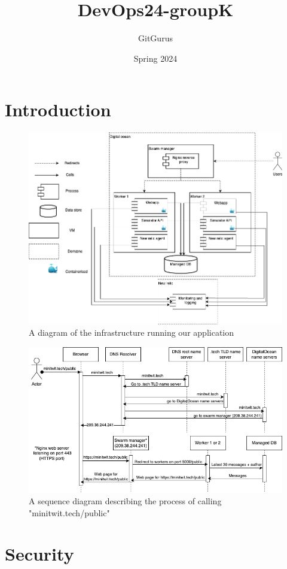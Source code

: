 \documentclass{article}
\title{DevOps24-groupK}
\author{GitGurus}
\date{Spring 2024}
\begin{document}
\maketitle

\section{Introduction}
\begin{figure}[H]
    \centering
    \includegraphics[width=\textwidth]{devops-overview.png}
    \caption{A diagram of the infrastructure running our application}
    \label{fig:infrastructure}
\end{figure}
\begin{figure}[H]
    \centering
    \includegraphics[width=\textwidth]{devops-sequence.png}
    \caption{A sequence diagram describing the process of calling "minitwit.tech/public"}
    \label{fig:sequence}
\end{figure}

\section{Security}
\end{document}
